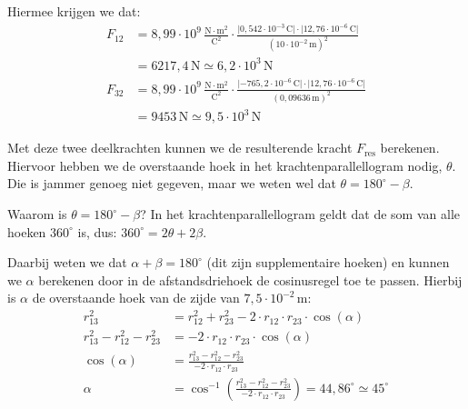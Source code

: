 \documentclass{ximera}
\begin{document}
\begin{example}[foldable=true,title={Voorbeeld: drie ladingen niet op een lijn}]
\begin{solution}
        Hiermee krijgen we dat:
        \begin{align*}
            F_{12} &= 8{,}99 \cdot 10^9 \, \mathrm{\frac{N\cdot m^2}{C^2}} \cdot \frac{\lvert 0{,}542 \cdot 10^{-3} \, \mathrm{C} \rvert \cdot \lvert 12{,}76 \cdot 10^{-6} \, \mathrm{C}\rvert}{(10 \cdot 10^{-2} \, \mathrm{m})^{2}} \\
            &= 6217{,}4 \, \mathrm{N}\simeq 6{,}2 \cdot 10^3 \, \mathrm{N} \\
            F_{32} &= 8{,}99 \cdot 10^9 \, \mathrm{\frac{N\cdot m^2}{C^2}} \cdot \frac{\lvert -765{,}2 \cdot 10^{-6} \, \mathrm{C}\rvert \cdot \lvert 12{,}76 \cdot 10^{-6} \, \mathrm{C}\rvert}{(0{,}09636 \, \mathrm{m})^{2}} \\
            &= 9453 \, \mathrm{N}\simeq 9{,}5 \cdot 10^3 \, \mathrm{N}
        \end{align*}    
        
        Met deze twee deelkrachten kunnen we de resulterende kracht $F_{\text{res}}$ berekenen. Hiervoor hebben we de overstaande hoek in het krachtenparallellogram nodig, $\theta$. Die is jammer genoeg niet gegeven, maar we weten wel dat $\theta = 180^\circ - \beta$. 
        
        \begin{hint}
            Waarom is $\theta = 180^\circ - \beta$? In het krachtenparallellogram geldt dat de som van alle hoeken $360^\circ$ is, dus: $360^\circ = 2\theta + 2\beta$.
        \end{hint}

        Daarbij weten we dat $\alpha + \beta = 180^\circ$ (dit zijn supplementaire hoeken) en kunnen we $\alpha$ berekenen door in de afstandsdriehoek de cosinusregel toe te passen. Hierbij is $\alpha$ de overstaande hoek van de zijde van $7{,}5 \cdot 10^{-2} \, \mathrm{m}$:
        \begin{align*}
            r^{2}_{13} &= r^{2}_{12} + r^{2}_{23} - 2 \cdot r_{12} \cdot r_{23} \cdot \cos(\alpha) \\
            r^{2}_{13} - r^{2}_{12} - r^{2}_{23} &= -2 \cdot r_{12} \cdot r_{23} \cdot \cos(\alpha) \\
            \cos(\alpha) &= \frac{r^{2}_{13} - r^{2}_{12} - r^{2}_{23}}{-2 \cdot r_{12} \cdot r_{23}} \\
            \alpha &= \cos^{-1} \left( \frac{r^{2}_{13} - r^{2}_{12} - r^{2}_{23}}{-2 \cdot r_{12} \cdot r_{23}} \right) = 44{,}86^\circ \simeq 45^\circ
        \end{align*}
        

\end{solution}
\end{example}
\end{document}
